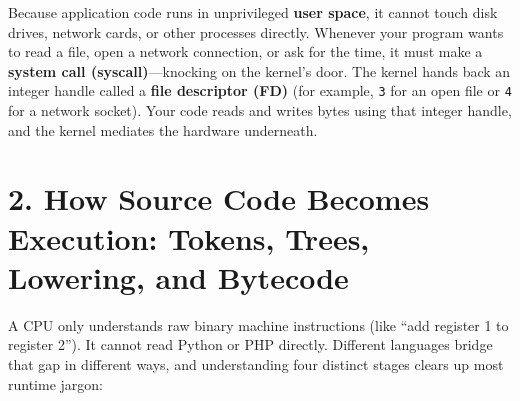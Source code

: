 Because application code runs in unprivileged \textbf{user space}, it cannot touch disk drives, network cards, or other processes directly. Whenever your program wants to read a file, open a network connection, or ask for the time, it must make a \textbf{system call (syscall)}---knocking on the kernel's door. The kernel hands back an integer handle called a \textbf{file descriptor (FD)} (for example, \texttt{3} for an open file or \texttt{4} for a network socket). Your code reads and writes bytes using that integer handle, and the kernel mediates the hardware underneath.

\section*{2. How Source Code Becomes Execution: Tokens, Trees, Lowering, and Bytecode}
\label{sec:primer-compilers}

A CPU only understands raw binary machine instructions (like ``add register 1 to register 2''). It cannot read Python or PHP directly. Different languages bridge that gap in different ways, and understanding four distinct stages clears up most runtime jargon:

